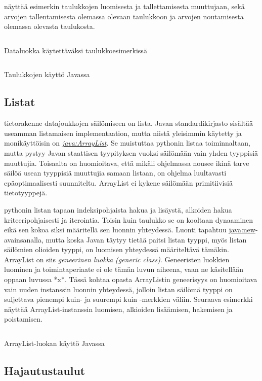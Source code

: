 \documentclass{tufte-book}
\newcommand{\eng}[1]{\textit{(#1)}}
\newcommand{\new}[1]{\textit{\gls{#1}}}
\newcommand{\neweng}[2]{\new{#1} \eng{#2}}
\newcommand{\java}[1]{\underline{\gls{java:#1}}}
\newcommand{\newjava}[1]{\textit{\java{#1}}}
\newcommand{\code}[3]{
\begin{listing}
    \inputminted{java}{OhjelmointiopasEsimerkit/src/#1/#2.java}
    \caption{#3}
    \label{Java-#1-#2}
\end{listing}
}
\begin{document}
 näyttää esimerkin taulukkojen luomisesta ja tallettamisesta
muuttujaan, sekä arvojen tallentamisesta olemassa olevaan taulukkoon ja arvojen noutamisesta
olemassa olevasta taulukosta.

\code{week3}{BasicArrayDataPoint}{Dataluokka käytettäväksi taulukkoesimerkissä}
\code{week3}{BasicArray}{Taulukkojen käyttö Javassa}

\subsection{Listat}
\label{listat}

 tietorakenne datajoukkojen säilömiseen on lista. Javan
standardikirjasto sisältää useamman listamaisen implementaation, mutta niistä yleisimmin käytetty 
ja monikäyttöisin on \newjava{ArrayList}. Se muistuttaa pythonin listaa toiminnaltaan, mutta
pystyy Javan staattisen tyypityksen vuoksi säilömään vain yhden tyyppisiä muuttujia. Toisaalta on
huomioitava, että mikäli ohjelmassa nousee ikinä tarve säilöä usean tyyppisiä muuttujia samaan
listaan, on ohjelma luultavasti epäoptimaalisesti suunniteltu. ArrayList ei kykene säilömään
primitiivisiä tietotyyppejä.

\newthought{\java{ArrayList} tukee} pythonin listan tapaan indeksipohjaista hakua ja lisäystä,
alkoiden hakua kriteeripohjaisesti ja iterointia. Toisin kuin taulukko se on kooltaan dynaaminen
eikä sen kokoa siksi määritellä sen luonnin yhteydessä. Luonti tapahtuu \java{new}-avainsanalla,
mutta koska Javan täytyy tietää paitsi listan tyyppi, myös listan säilömien olioiden tyyppi, on
luomisen yhteydessä määriteltävä tämäkin. ArrayList on siis
\neweng{geneerinen luokka}{generic class}. Geneeristen luokkien luominen ja toimintaperiaate
ei ole tämän luvun aiheena, vaan ne käsitellään oppaan luvussa *x*. %
Tässä kohtaa opasta ArrayListin geneerisyys on huomioitava vain uuden instanssin luonnin
yhteydessä, jolloin listan säilömä tyyppi on suljettava pienempi kuin- ja suurempi kuin -merkkien
väliin. Seuraava esimerkki näyttää ArrayList-instanssin luomisen, alkioiden lisäämisen, hakemisen
ja poistamisen.

\code{week3}{BasicArrayList}{ArrayList-luokan käyttö Javassa}

\subsection{Hajautustaulut}
\label{HashMap}
\end{document}
